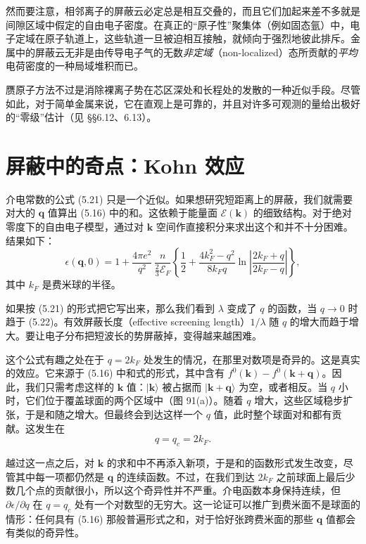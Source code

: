 
然而要注意，相邻离子的屏蔽云必定总是相互交叠的，而且它们加起来差不多就是间隙区域中假定的自由电子密度。在真正的“原子性”聚集体（例如固态氩）中，电子定域在原子轨道上，这些轨道一旦被迫相互接触，就倾向于强烈地彼此排斥。金属中的屏蔽云无非是由传导电子气的无数\emph{非定域}（non-localized）态所贡献的\emph{平均}电荷密度的一种局域堆积而已。

赝原子方法不过是消除裸离子势在芯区深处和长程处的发散的一种近似手段。尽管如此，对于简单金属来说，它在直观上是可靠的，并且对许多可观测的量给出极好的“零级”估计（见 §§6.12、6.13）。

\section{屏蔽中的奇点：Kohn 效应}

介电常数的公式 (5.21) 只是一个近似。如果想研究短距离上的屏蔽，我们就需要对大的 $\mathbf{q}$ 值算出 (5.16) 中的和。这依赖于能量面 $\mathcal{E}(\mathbf{k})$ 的细致结构。对于绝对零度下的自由电子模型，通过对 $\mathbf{k}$ 空间作直接积分来求出这个和并不十分困难。结果如下：
\begin{equation*}
\epsilon(\mathbf{q},0)=1+\frac{4\pi e^{2}}{q^{2}}\,\frac{n}{\frac{2}{3}\mathcal{E}_{F}}\left\{\frac{1}{2}+\frac{4k_{F}^{2}-q^{2}}{8k_{F}q}\ln\left|\frac{2k_{F}+q}{2k_{F}-q}\right|\right\},
\tag{5.36}
\end{equation*}
其中 $k_{F}$ 是费米球的半径。


如果按 (5.21) 的形式把它写出来，那么我们看到 $\lambda$ 变成了 $q$ 的函数，当 $q\to 0$ 时趋于 (5.22)。有效屏蔽长度（effective screening length）$1/\lambda$ 随 $q$ 的增大而趋于增大。要让电子分布把短波长的势屏蔽掉，变得越来越困难。

这个公式有趣之处在于 $q=2k_{F}$ 处发生的情况，在那里对数项是奇异的。这是真实的效应。它来源于 (5.16) 中和式的形式，其中含有 $f^{0}(\mathbf{k})-f^{0}(\mathbf{k}+\mathbf{q})$。因此，我们只需考虑这样的 $\mathbf{k}$ 值：$|\mathbf{k}\rangle$ 被占据而 $|\mathbf{k}+\mathbf{q}\rangle$ 为空，或者相反。当 $q$ 小时，它们位于覆盖球面的两个区域中（图 91(a)）。随着 $q$ 增大，这些区域稳步扩张，于是和随之增大。但最终会到达这样一个 $q$ 值，此时整个球面对和都有贡献。这发生在
\begin{equation*}
q=q_{c}=2k_{F}.
\tag{5.37}
\end{equation*}

越过这一点之后，对 $\mathbf{k}$ 的求和中不再添入新项，于是和的函数形式发生改变，尽管其中每一项都仍然是 $\mathbf{q}$ 的连续函数。不过，在我们到达 $2k_{F}$ 之前球面上最后少数几个点的贡献很小，所以这个奇异性并不严重。介电函数本身保持连续，但 $\partial\epsilon/\partial q$ 在 $q=q_{c}$ 处有一个对数型的无穷大。这一论证可以推广到费米面不是球面的情形：任何具有 (5.16) 那般普遍形式之和，对于恰好张跨费米面的那些 $\mathbf{q}$ 值都会有类似的奇异性。

